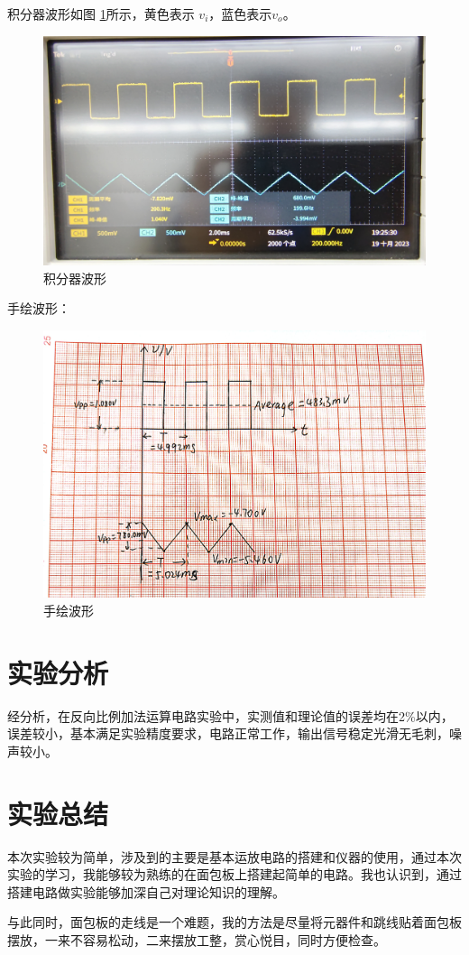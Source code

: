 \documentclass[a4paper]{article}
\theoremstyle{definition}
\theoremstyle{plain}
\theoremstyle{remark}
\newcommand{\reffig}[1]{图 \ref{#1}}
\begin{document}
积分器波形如\reffig{积分器波形}所示，黄色表示 $v_i$，蓝色表示$v_o$。
\begin{figure}[H]
	\centering
	\includegraphics[width=1\textwidth]{积分器波形}
	\caption{积分器波形}
	\label{积分器波形}
\end{figure}

手绘波形：
\begin{figure}[H]
	\centering
	\includegraphics[width=1\textwidth]{手绘波形}
	\caption{手绘波形}
	\label{手绘波形}
\end{figure}
\section{实验分析}
经分析，在反向比例加法运算电路实验中，实测值和理论值的误差均在2\%以内，误差较小，基本满足实验精度要求，电路正常工作，输出信号稳定光滑无毛刺，噪声较小。
\section{实验总结}

本次实验较为简单，涉及到的主要是基本运放电路的搭建和仪器的使用，通过本次实验的学习，我能够较为熟练的在面包板上搭建起简单的电路。我也认识到，通过搭建电路做实验能够加深自己对理论知识的理解。

与此同时，面包板的走线是一个难题，我的方法是尽量将元器件和跳线贴着面包板摆放，一来不容易松动，二来摆放工整，赏心悦目，同时方便检查。

\clearpage
\appendix
{}
\end{document}
